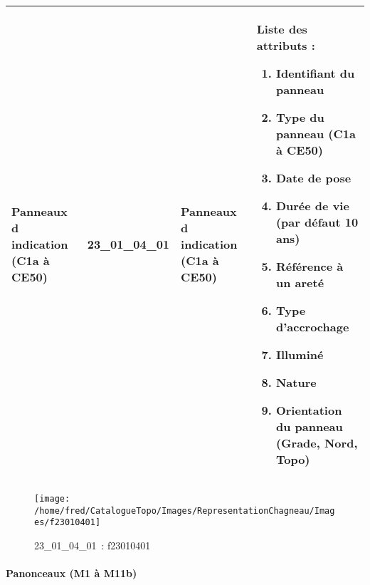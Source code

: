\documentclass[12pt,titlepage]{book}
\begin{document}
\renewcommand{\arraystretch}{1.2}
\begin{supertabular}{|p{10cm}|c|p{13cm}|p{12cm}|}
 Panneaux d indication (C1a à CE50) & 23\_01\_04\_01 & Panneaux d indication (C1a à CE50) & Liste des attributs :
\begin{enumerate}
  \item Identifiant du panneau  \item Type du panneau (C1a à CE50)  \item Date de pose  \item Durée de vie (par défaut 10 ans)  \item Référence à un areté  \item Type d'accrochage  \item Illuminé  \item Nature  \item Orientation du panneau (Grade, Nord, Topo)\end{enumerate}
\\
\hline
\end{supertabular}
\begin{figure}[h!]
  \hfill         %
  \begin{minipage}[t]{3cm}
    \begin{center}
      \texttt{[image: /home/fred/CatalogueTopo/Images/RepresentationChagneau/Images/f23010401]}
      \caption[~23\_01\_04\_01]{\small{23\_01\_04\_01~:} \tiny{f23010401}}\label{f23010401}
    \end{center}
  \end{minipage}
\end{figure}


\paragraph{Panonceaux (M1 à M11b)}
\noindent
\vspace{\baselineskip}
\end{document}
